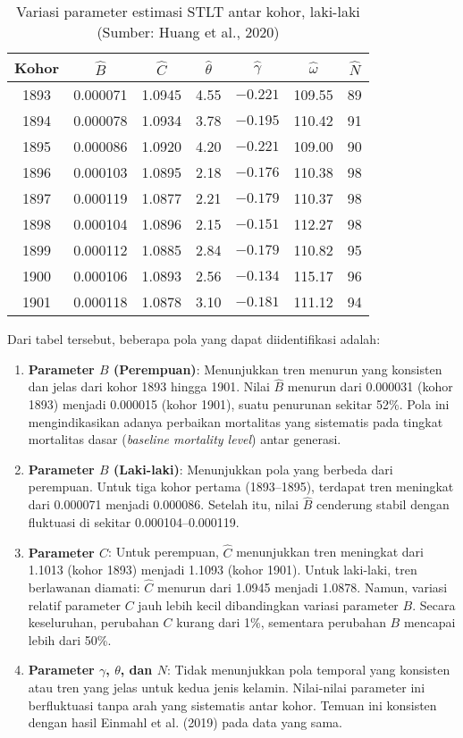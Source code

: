 \begin{table}[H]
\centering
\caption{Variasi parameter estimasi STLT antar kohor, laki-laki (Sumber: Huang et al., 2020)}
\label{tab:stlt_params_male}
\begin{tabular}{ccccccc}
\hline
Kohor & $\hat{B}$ & $\hat{C}$ & $\hat{\theta}$ & $\hat{\gamma}$ & $\hat{\omega}$ & $\hat{N}$ \\
\hline
1893 & 0.000071 & 1.0945 & 4.55 & $-0.221$ & 109.55 & 89 \\
1894 & 0.000078 & 1.0934 & 3.78 & $-0.195$ & 110.42 & 91 \\
1895 & 0.000086 & 1.0920 & 4.20 & $-0.221$ & 109.00 & 90 \\
1896 & 0.000103 & 1.0895 & 2.18 & $-0.176$ & 110.38 & 98 \\
1897 & 0.000119 & 1.0877 & 2.21 & $-0.179$ & 110.37 & 98 \\
1898 & 0.000104 & 1.0896 & 2.15 & $-0.151$ & 112.27 & 98 \\
1899 & 0.000112 & 1.0885 & 2.84 & $-0.179$ & 110.82 & 95 \\
1900 & 0.000106 & 1.0893 & 2.56 & $-0.134$ & 115.17 & 96 \\
1901 & 0.000118 & 1.0878 & 3.10 & $-0.181$ & 111.12 & 94 \\
\hline
\end{tabular}
\end{table}

Dari tabel tersebut, beberapa pola yang dapat diidentifikasi adalah:

\begin{enumerate}
\item \textbf{Parameter $B$ (Perempuan)}: Menunjukkan tren menurun yang konsisten dan jelas dari kohor 1893 hingga 1901. Nilai $\hat{B}$ menurun dari 0.000031 (kohor 1893) menjadi 0.000015 (kohor 1901), suatu penurunan sekitar 52\%. Pola ini mengindikasikan adanya perbaikan mortalitas yang sistematis pada tingkat mortalitas dasar (\textit{baseline mortality level}) antar generasi.

\item \textbf{Parameter $B$ (Laki-laki)}: Menunjukkan pola yang berbeda dari perempuan. Untuk tiga kohor pertama (1893--1895), terdapat tren meningkat dari 0.000071 menjadi 0.000086. Setelah itu, nilai $\hat{B}$ cenderung stabil dengan fluktuasi di sekitar 0.000104--0.000119.

\item \textbf{Parameter $C$}: Untuk perempuan, $\hat{C}$ menunjukkan tren meningkat dari 1.1013 (kohor 1893) menjadi 1.1093 (kohor 1901). Untuk laki-laki, tren berlawanan diamati: $\hat{C}$ menurun dari 1.0945 menjadi 1.0878. Namun, variasi relatif parameter $C$ jauh lebih kecil dibandingkan variasi parameter $B$. Secara keseluruhan, perubahan $C$ kurang dari 1\%, sementara perubahan $B$ mencapai lebih dari 50\%.

\item \textbf{Parameter $\gamma$, $\theta$, dan $N$}: Tidak menunjukkan pola temporal yang konsisten atau tren yang jelas untuk kedua jenis kelamin. Nilai-nilai parameter ini berfluktuasi tanpa arah yang sistematis antar kohor. Temuan ini konsisten dengan hasil Einmahl et al. (2019) pada data yang sama.
\end{enumerate}

